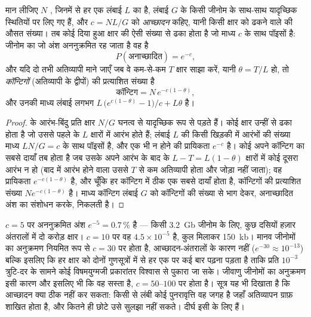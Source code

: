 \begin{theorem}[किसी शॉटगन परियोजना में आच्छादन और अंतराल]\label{thm:b3:genomics:lander-waterman}
मान लीजिए $N$ , जिनमें से हर एक लंबाई $L$ का है, लंबाई $G$ के
किसी जीनोम के साथ-साथ यादृच्छिक स्थितियों पर लिए गए हैं, और $c = NL/G$ को \emph{आच्छादन}
कहिए, यानी किसी क्षार को ढकने वाले  की औसत संख्या। तब कोई दिया
हुआ क्षार  की ऐसी संख्या से ढका होता है जो माध्य $c$ के साथ
पॉइसों है: जीनोम का जो अंश अननुक्रमित रह जाता है वह है
\[
P(\text{अनाच्छादित}) = e^{-c},
\]
और यदि दो  तभी अतिव्यापी माने जाएँ जब वे कम-से-कम $T$ क्षार साझा
करें, यानी $\theta = T/L$ हो, तो \emph{कॉन्टिगों} (अतिव्यापी  के
द्वीपों) की प्रत्याशित संख्या है
\[
\text{कॉन्टिग} = N\,e^{-c(1-\theta)},
\]
और उनकी माध्य लंबाई लगभग
$L\,\bigl(e^{c(1-\theta)} - 1\bigr)/c + L\theta$ है।
\end{theorem}
\begin{proof}
 के आरंभ-बिंदु प्रति क्षार $N/G$ घनत्व से यादृच्छिक रूप से पड़ते
हैं। कोई क्षार उन्हीं  से ढका होता है जो उससे पहले के $L$ क्षारों
में आरंभ होते हैं; लंबाई $L$ की किसी खिड़की में आरंभों की संख्या माध्य $LN/G
= c$ के साथ पॉइसों है, और एक भी न होने की प्रायिकता $e^{-c}$ है। कोई
 अपने कॉन्टिग का सबसे दायाँ तब होता है जब उसके अपने आरंभ के बाद के
$L - T = L(1-\theta)$ क्षारों में कोई दूसरा  आरंभ न हो (बाद में
आरंभ होने वाला  उससे $T$ से कम अतिव्यापी होता और जोड़ा नहीं जाता);
वह प्रायिकता $e^{-c(1-\theta)}$ है, और चूँकि हर कॉन्टिग में ठीक एक
सबसे दायाँ  होता है, कॉन्टिगों की प्रत्याशित संख्या
$N e^{-c(1-\theta)}$ है। माध्य कॉन्टिग लंबाई $G$ को कॉन्टिगों की
संख्या से भाग देकर, अनाच्छादित अंश का संशोधन करके, निकलती है।
\end{proof}

\begin{example}[कितना पर्याप्त है]\label{ex:b3:genomics:coverage}
$c = 5$ पर अननुक्रमित अंश $e^{-5} = 0.7\,\%$ है --- किसी \qty{3.2}{Gb}
जीनोम के लिए, कुछ दसियों हज़ार अंतरालों में दो करोड़ क्षार। $c = 10$ पर
वह $4.5\times 10^{-5}$ है, कुल मिलाकर \qty{150}{kb}। मानव जीनोमों का
अनुक्रमण नियमित रूप से $c = 30$ पर होता है, आच्छादन-अंतरालों के कारण
नहीं ($e^{-30} \approx 10^{-13}$) बल्कि इसलिए कि हर क्षार को दोनों
गुणसूत्रों में से हर एक पर कई बार पढ़ना पड़ता है ताकि प्रति 
$10^{-3}$ त्रुटि-दर के सामने कोई विषमयुग्मजी प्रकारांतर विश्वास से पुकारा
जा सके। जीवाणु जीनोमों का अनुक्रमण इसी कारण और इसलिए भी कि वह सस्ता है,
$c = 50$--$100$ पर होता है। सूत्र यह भी दिखाता है कि आच्छादन क्या ठीक
नहीं कर सकता: किसी  से लंबी कोई पुनरावृत्ति वह जगह है जहाँ
अतिव्यापन ग्राफ़ शाखित होता है, और कितने ही छोटे  उसे सुलझा नहीं
सकते। दीर्घ  इसी के लिए हैं।
\end{example}

